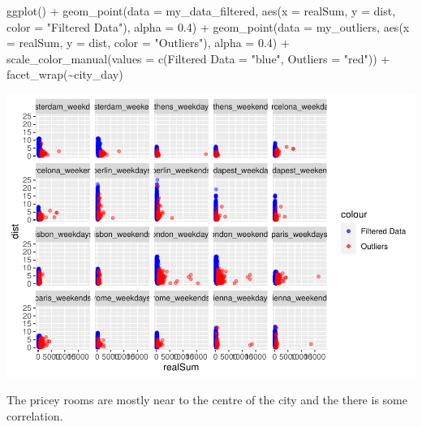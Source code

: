 \documentclass[
]{article}
\newenvironment{Shaded}{\begin{snugshade}}{\end{snugshade}}
\newcommand{\AttributeTok}[1]{\textcolor[rgb]{0.77,0.63,0.00}{#1}}
\newcommand{\FloatTok}[1]{\textcolor[rgb]{0.00,0.00,0.81}{#1}}
\newcommand{\FunctionTok}[1]{\textcolor[rgb]{0.00,0.00,0.00}{#1}}
\newcommand{\NormalTok}[1]{#1}
\newcommand{\OtherTok}[1]{\textcolor[rgb]{0.56,0.35,0.01}{#1}}
\newcommand{\SpecialCharTok}[1]{\textcolor[rgb]{0.00,0.00,0.00}{#1}}
\newcommand{\StringTok}[1]{\textcolor[rgb]{0.31,0.60,0.02}{#1}}
\begin{document}
\begin{Shaded}
\begin{Highlighting}[]
\FunctionTok{ggplot}\NormalTok{() }\SpecialCharTok{+} \FunctionTok{geom\_point}\NormalTok{(}\AttributeTok{data =}\NormalTok{ my\_data\_filtered, }\FunctionTok{aes}\NormalTok{(}\AttributeTok{x =}\NormalTok{ realSum,}
    \AttributeTok{y =}\NormalTok{ dist, }\AttributeTok{color =} \StringTok{"Filtered Data"}\NormalTok{), }\AttributeTok{alpha =} \FloatTok{0.4}\NormalTok{) }\SpecialCharTok{+} \FunctionTok{geom\_point}\NormalTok{(}\AttributeTok{data =}\NormalTok{ my\_outliers,}
    \FunctionTok{aes}\NormalTok{(}\AttributeTok{x =}\NormalTok{ realSum, }\AttributeTok{y =}\NormalTok{ dist, }\AttributeTok{color =} \StringTok{"Outliers"}\NormalTok{), }\AttributeTok{alpha =} \FloatTok{0.4}\NormalTok{) }\SpecialCharTok{+}
    \FunctionTok{scale\_color\_manual}\NormalTok{(}\AttributeTok{values =} \FunctionTok{c}\NormalTok{(}\StringTok{\textasciigrave{}}\AttributeTok{Filtered Data}\StringTok{\textasciigrave{}} \OtherTok{=} \StringTok{"blue"}\NormalTok{, }\AttributeTok{Outliers =} \StringTok{"red"}\NormalTok{)) }\SpecialCharTok{+}
    \FunctionTok{facet\_wrap}\NormalTok{(}\SpecialCharTok{\textasciitilde{}}\NormalTok{city\_day)}
\end{Highlighting}
\end{Shaded}

\includegraphics{Project_files/figure-latex/unnamed-chunk-16-2.pdf}

The pricey rooms are mostly near to the centre of the city and the there
is some correlation.
\end{document}
